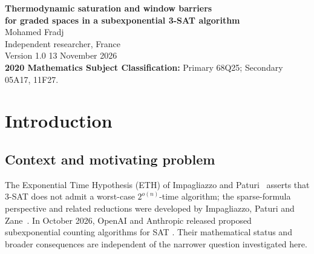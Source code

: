 \documentclass[10pt,a4paper]{article}
\numberwithin{equation}{section}
\theoremstyle{remark}\newtheorem{remark}[theorem]{Remark}\newtheorem{question}[theorem]{Question}
\newcommand{\rhow}{\rho_{\mathrm{win}}}\newcommand{\F}{\mathbb F}\newcommand{\K}{\mathbb K}\newcommand{\Z}{\mathbb Z}\newcommand{\R}{\mathbb R}\newcommand{\cB}{\mathcal L}\newcommand{\wt}{\mathrm{wt}}\newcommand{\dimn}{\operatorname{dim}}\newcommand{\supp}{\operatorname{supp}}
\begin{document}
\begin{center}
{\LARGE\bfseries\color{deep} Thermodynamic saturation and window barriers}\\[2pt]
{\Large\bfseries\color{deep} for graded spaces in a subexponential 3-SAT algorithm}\\[9pt]
{\large Mohamed Fradj}\\[3pt]
{\small Independent researcher, France}\\[4pt]
{\small Version 1.0 \textbullet{} 13 November 2026}\\[4pt]
{\footnotesize \textbf{2020 Mathematics Subject Classification:} Primary 68Q25; Secondary 05A17, 11F27.}
\end{center}

\begin{abstract}
Motivated by the graded four-leg construction in the subexponential
3-SAT algorithm proposed by Anthropic, we study the normalized costs
of prescribed graded windows, rather than the intrinsic ranks of the
resulting factorization matrices. For every compact interval
$\mathcal J=[x_1,x_2]\Subset(0,\infty)$, we establish for Kleinian-code
graded spaces $V_S$ the uniform estimate
\[
\rhow(V_S;h,\lambda)\ge\frac{1}{\sqrt2}+\eta_{\mathcal J}
 -C_{\mathcal J}m^{-1/2},\qquad
 h/m\in\mathcal J,\quad 2^\lambda\le\dimn(V_S)_h,
\]
where $\eta_{\mathcal J}>0$ and the constants do not depend on the
isotropic additive code $S\subset\K^m$. The proof combines a central-window
bound, a sectorwise thermodynamic sign criterion and certified interval
arithmetic. No concavity or asymptotic convergence of the code-weight
spectrum is assumed. In particular, this fixed-density bound does not
resolve the single-block regime $h/m\to\infty$ or determine intrinsic
factorization ranks.
\end{abstract}
\tableofcontents
\section{Introduction}
\subsection{Context and motivating problem}
The Exponential Time Hypothesis (ETH) of Impagliazzo and Paturi~\cite{ip}
asserts that 3-SAT does not admit a worst-case $2^{o(n)}$-time
algorithm; the sparse-formula perspective and related reductions
were developed by Impagliazzo, Paturi and Zane~\cite{ipz}. In October 2026, OpenAI and
Anthropic released proposed subexponential counting algorithms for SAT
\cite{openaieth,claude3sat}. Their mathematical status and broader
consequences are independent of the narrower question investigated here.
\end{document}
